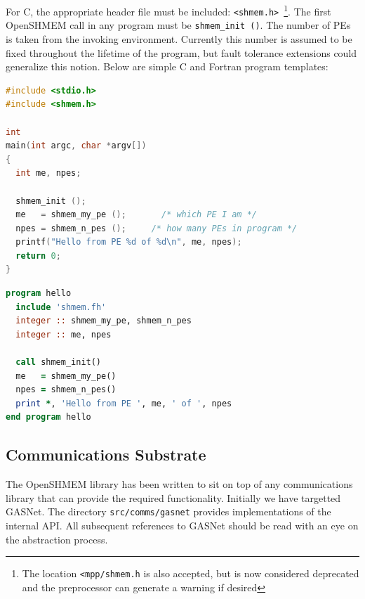\documentclass[english]{article}
\newcommand{\openshmem} {\mbox{OpenSHMEM}\xspace}
\begin{document}
For C, the appropriate header file must be included:
\texttt{<shmem.h>}~\footnote{The location \texttt{<mpp/shmem.h} is
  also accepted, but is now considered deprecated and the preprocessor
  can generate a warning if desired}.  The first \openshmem call in
any program must be \texttt{shmem\_init ()}.  The number of PEs is
taken from the invoking environment. Currently this number is assumed
to be fixed throughout the lifetime of the program, but fault
tolerance extensions could generalize this notion. Below are simple C
and Fortran program templates:

\vspace{0.1in}
\begin{minipage}{0.75\linewidth}
\begin{lstlisting}[language=C,caption={Simple C ``hello world'' program}]
#include <stdio.h>
#include <shmem.h>

int
main(int argc, char *argv[])
{
  int me, npes;

  shmem_init ();
  me   = shmem_my_pe ();       /* which PE I am */
  npes = shmem_n_pes ();     /* how many PEs in program */
  printf("Hello from PE %d of %d\n", me, npes);
  return 0;
}
\end{lstlisting}
\end{minipage}

\vspace{0.1in}

\begin{minipage}{0.75\linewidth}
\begin{lstlisting}[language=Fortran,caption={Simple Fortran ``hello world'' program}]
program hello
  include 'shmem.fh'
  integer :: shmem_my_pe, shmem_n_pes
  integer :: me, npes

  call shmem_init()
  me   = shmem_my_pe()
  npes = shmem_n_pes()
  print *, 'Hello from PE ', me, ' of ', npes
end program hello
\end{lstlisting}
\end{minipage}

\subsection{Communications Substrate}

The \openshmem library has been written to sit on top of any
communications library that can provide the required
functionality. Initially we have targetted GASNet. The directory
\texttt{src/comms/gasnet} provides implementations of the internal
API. All subsequent references to GASNet should be read with an eye on
the abstraction process.
\end{document}
